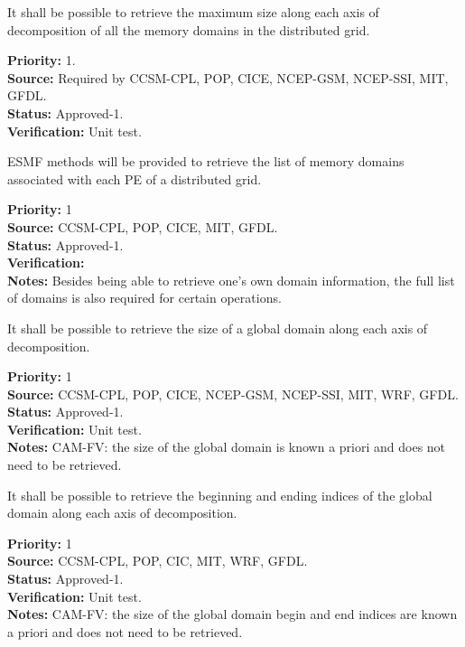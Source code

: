 
It shall be possible to retrieve the maximum size along each axis of
decomposition of all the memory domains in the distributed grid. 

\begin{reqlist}
{\bf Priority:} 1. \\
{\bf Source:} Required by CCSM-CPL, POP, CICE, NCEP-GSM, NCEP-SSI, MIT, GFDL. \\
{\bf Status:} Approved-1. \\
{\bf Verification:} Unit test.
\end{reqlist}


ESMF methods will be provided to retrieve the list of memory
domains associated with each PE of a distributed grid.

\begin{reqlist}
{\bf Priority:} 1 \\
{\bf Source:} CCSM-CPL, POP, CICE, MIT, GFDL. \\
{\bf Status:} Approved-1. \\
{\bf Verification:} \\
{\bf Notes:} Besides being able to retrieve one's own domain
  information, the full list of domains is also required for certain
  operations.
\end{reqlist}



It shall be possible to retrieve the size of a global domain
along each axis of decomposition.

\begin{reqlist}
{\bf Priority:} 1 \\
{\bf Source:} CCSM-CPL, POP, CICE, NCEP-GSM, NCEP-SSI, MIT, WRF, GFDL. \\
{\bf Status:} Approved-1. \\
{\bf Verification:} Unit test.\\
{\bf Notes:} CAM-FV: the size of the global domain is known
a priori and does not need to be retrieved.
\end{reqlist}


It shall be possible to retrieve the beginning and ending indices of the
global domain along each axis of decomposition.

\begin{reqlist}
{\bf Priority:} 1 \\
{\bf Source:} CCSM-CPL, POP, CIC, MIT, WRF, GFDL. \\
{\bf Status:} Approved-1. \\
{\bf Verification:} Unit test. \\
{\bf Notes:} CAM-FV: the size of the global domain begin and end
indices are known a priori and does not need to be retrieved.
\end{reqlist}

